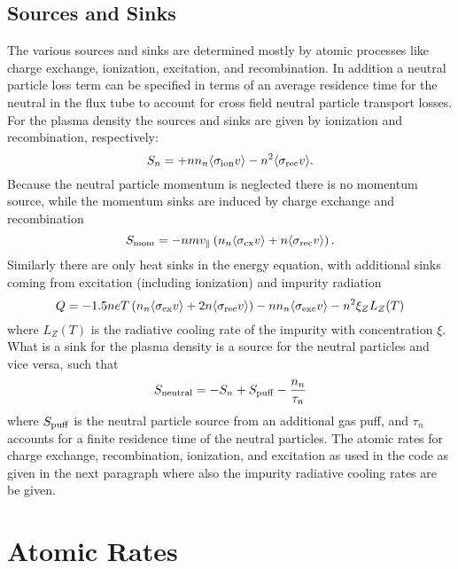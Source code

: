 \documentclass[amsmath,amssymb,a4]{revtex4}
\begin{document}
\subsection{Sources and Sinks}

The various sources and sinks are determined mostly by atomic processes like charge exchange, ionization, excitation, and recombination. In addition a neutral particle loss term can be specified in terms of an average residence time for the neutral in the flux tube to account for cross field neutral particle transport losses. For the plasma density the sources and sinks are given by ionization and recombination, respectively:
\begin{equation}\label{particle_source}
    S_n = + n n_n \langle\sigma_{\rm ion} v\rangle - n^2 \langle\sigma_{\rm rec} v\rangle.
\end{equation}
Because the neutral particle momentum is neglected there is no momentum source, while the momentum sinks are induced by charge exchange and recombination
\begin{equation}\label{momentum_source}
    S_{\rm mom} = - n m v_\parallel \left(n_n \langle\sigma_{\rm cx} v\rangle + n \langle\sigma_{\rm rec} v\rangle \right).
\end{equation}
Similarly there are only heat sinks in the energy equation, with additional sinks coming from excitation (including ionization) and impurity radiation
\begin{equation}\label{energy_source}
    Q = - 1.5 n e T \left(n_n \langle\sigma_{\rm cx} v\rangle + 2 n \langle\sigma_{\rm rec} v\rangle \right) - n n_n \langle\sigma_{\rm exc} v\rangle - n^2 \xi_Z L_Z(T)
\end{equation}
where $L_Z(T)$ is the radiative cooling rate of the impurity with concentration $\xi$. What is a sink for the plasma density is a source for the neutral particles and vice versa, such that
\begin{equation}\label{neutral_source}
    S_{\rm neutral} = - S_n + S_{\rm puff} - {n_n \over \tau_n}
\end{equation}
where $S_{\rm puff}$ is the neutral particle source from an additional gas puff, and $\tau_n$ accounts for a finite residence time of the neutral particles. The atomic rates for charge exchange, recombination, ionization, and excitation as used in the code as given in the next paragraph where also the impurity radiative cooling rates are be given.


\section{Atomic Rates}\label{rates}
\end{document}

